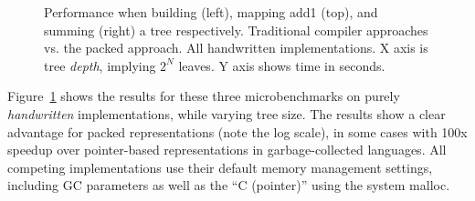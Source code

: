 \documentclass[a4paper,english]{lipics-v2016}
\begin{document}
\begin{figure}[t]
\begin{minipage}{1.02\textwidth}
\end{minipage}
  \caption{Performance when building (left), mapping add1 (top), and summing
    (right) a tree respectively.  Traditional compiler approaches vs. the packed
    approach.  All handwritten implementations.  X axis is tree {\em depth},
    implying $2^N$ leaves.  Y axis shows time in seconds.}
  \label{fig:shootout1}
\end{figure}

Figure~\ref{fig:shootout1} shows the results for these three microbenchmarks on
purely {\em handwritten} implementations, while varying tree size.
The results show a clear advantage for
packed representations (note the log scale), in some cases with 100x speedup
over pointer-based representations in garbage-collected languages.  All
competing implementations use their default memory management settings,
including GC parameters as well as the ``C (pointer)'' using the system malloc.
\end{document}
